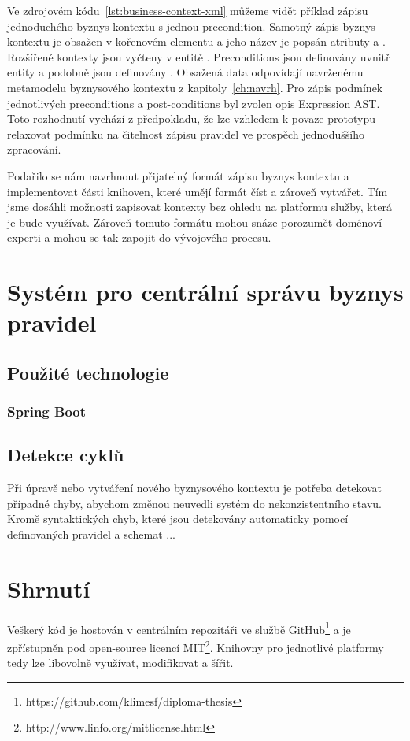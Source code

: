 Ve zdrojovém kódu~\ref{lst:business-context-xml} můžeme vidět
příklad zápisu jednoduchého byznys kontextu s jednou precondition.
Samotný zápis byznys kontextu je obsažen v kořenovém elementu
 a jeho název je popsán atributy
 a . Rozšířené kontexty jsou vyčteny
v entitě . Preconditions jsou
definovány uvnitř entity  a podobně
jsou definovány . Obsažená data odpovídají
navrženému metamodelu byznysového kontextu z kapitoly~\ref{ch:navrh}.
Pro zápis podmínek jednotlivých preconditions a post-conditions byl zvolen
opis Expression AST. Toto rozhodnutí vychází z předpokladu,
že lze vzhledem k povaze prototypu relaxovat podmínku
na čitelnost zápisu pravidel ve prospěch jednoduššího zpracování.

Podařilo se nám navrhnout přijatelný formát zápisu byznys kontextu
a implementovat části knihoven, které umějí formát číst a zároveň vytvářet.
Tím jsme dosáhli možnosti zapisovat kontexty bez ohledu na platformu
služby, která je bude využívat. Zároveň tomuto formátu mohou
snáze porozumět doménoví experti a mohou se tak zapojit do
vývojového procesu.



\section{Systém pro centrální správu byznys pravidel}

\subsection{Použité technologie}

\subsubsection{Spring Boot}

\subsection{Detekce cyklů}

Při úpravě nebo vytváření nového byznysového kontextu je
potřeba detekovat případné chyby, abychom změnou neuvedli
systém do nekonzistentního stavu. Kromě syntaktických chyb,
které jsou detekovány automaticky pomocí definovaných pravidel
a schemat ... %

\section{Shrnutí}

Veškerý kód je hostován v centrálním repozitáři
ve službě GitHub\footnote{
https://github.com/klimesf/diploma-thesis
} a je zpřístupněn pod open-source licencí MIT\footnote{
http://www.linfo.org/mitlicense.html
}. Knihovny pro jednotlivé platformy tedy lze libovolně
využívat, modifikovat a šířit.

